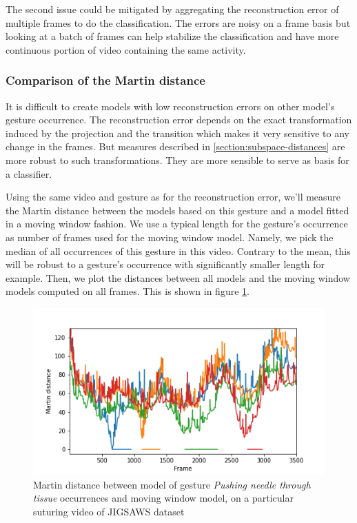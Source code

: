 \documentclass[twocolumn,10pt]{asme2ej}
\begin{document}
The second issue could be mitigated by aggregating the reconstruction error of multiple frames to do the classification. The errors are noisy on a frame basis but looking at a batch of frames can help stabilize the classification and have more continuous portion of video containing the same activity.

\subsubsection{Comparison of the Martin distance}
It is difficult to create models with low reconstruction errors on other model's gesture occurrence. The reconstruction error depends on the exact transformation induced by the projection and the transition which makes it very sensitive to any change in the frames. But measures described in \ref{section:subspace-distances} are more robust to such transformations. They are more sensible to serve as basis for a classifier.

Using the same video and gesture as for the reconstruction error, we'll measure the Martin distance between the models based on this gesture and a model fitted in a moving window fashion. We use a typical length for the gesture's occurrence as number of frames used for the moving window model. Namely, we pick the median of all occurrences of this gesture in this video. Contrary to the mean, this will be robust to a gesture's occurrence with significantly smaller length for example. Then, we plot the distances between all models and the moving window models computed on all frames. This is shown in figure \ref{fig:martin-distance}.

\begin{figure}[h]
    \centering
    \includegraphics[width=\columnwidth]{martin_distance_jigsaws_Suturing_B_trial1.png}
    \caption{Martin distance between model of gesture \textit{Pushing needle through tissue} occurrences and moving window model, on a particular suturing video of JIGSAWS dataset}
    \label{fig:martin-distance}
\end{figure}
\end{document}
